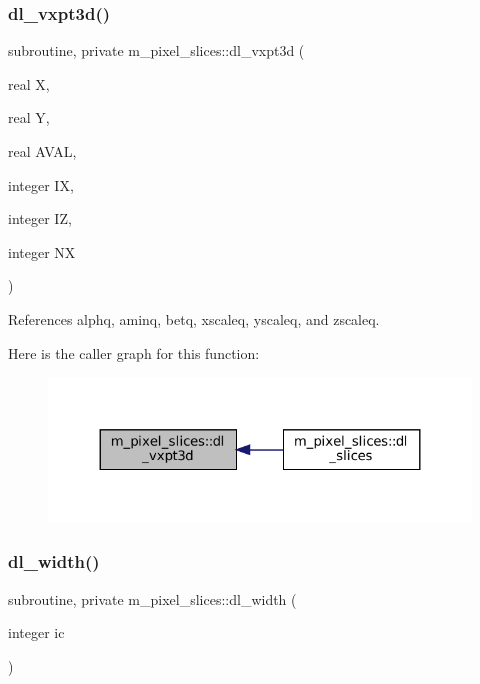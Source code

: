 \subsubsection{\texorpdfstring{dl\+\_\+vxpt3d()}{dl\_vxpt3d()}}
{\footnotesize\ttfamily subroutine, private m\+\_\+pixel\+\_\+slices\+::dl\+\_\+vxpt3d (\begin{DoxyParamCaption}\item[{real}]{X,  }\item[{real}]{Y,  }\item[{real}]{A\+V\+AL,  }\item[{integer}]{IX,  }\item[{integer}]{IZ,  }\item[{integer}]{NX }\end{DoxyParamCaption})\hspace{0.3cm}{\ttfamily [private]}}



References alphq, aminq, betq, xscaleq, yscaleq, and zscaleq.

Here is the caller graph for this function\+:\nopagebreak
\begin{figure}[H]
\begin{center}
\leavevmode
\includegraphics[width=324pt]{namespacem__pixel__slices_a61f419d67b700758eceed72e406a37f0_icgraph}
\end{center}
\end{figure}
\mbox{\label{namespacem__pixel__slices_a2a4bb6da0ae36c65fdf05996e3ae5487}} 
\subsubsection{\texorpdfstring{dl\+\_\+width()}{dl\_width()}}
{\footnotesize\ttfamily subroutine, private m\+\_\+pixel\+\_\+slices\+::dl\+\_\+width (\begin{DoxyParamCaption}\item[{integer}]{ic }\end{DoxyParamCaption})\hspace{0.3cm}{\ttfamily [private]}}



